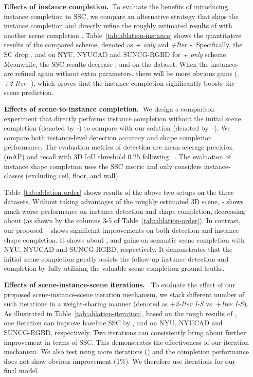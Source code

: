 \documentclass[final]{cvpr}
\begin{document}
\noindent \textbf{Effects of instance completion.~}To evaluate the benefits of introducing instance completion to SSC, we compare an alternative strategy that skips the instance completion and directly refine the roughly estimated results of  with another scene completion . Table~\ref{tab:ablation-instance} shows the quantitative results of the compared scheme, denoted as \textit{+  only} and \textit{+Iter -}. Specifically, the SC drop ,  and  on NYU, NYUCAD and SUNCG-RGBD for \textit{+ only} scheme. Meanwhile, the SSC results decrease ,  and  on the dataset. When the instances are refined again without extra parameters, there will be more obvious gains (\ie, \textit{+2-Iter -}), which proves that the instance completion significantly boosts the scene prediction. 




\noindent \textbf{Effects of scene-to-instance completion.~}We design a comparison experiment that directly performs instance completion without the initial scene completion (denoted by \textit{-}) to compare with our solution (denoted by \textit{--}). We compare both instance-level detection accuracy and shape completion performance. The evaluation metrics of detection are mean average precision (mAP) and recall with 3D IoU threshold 0.25 following ~\cite{song2015sun}. The evaluation of instance shape completion uses the SSC metric and only considers instance-classes (excluding ceil, floor, and wall).

Table~\ref{tab:ablation-order} shows results of the above two setups on the three datasets. 
Without taking advantages of the roughly estimated 3D scene, \textit{-} shows much worse performance on instance detection and shape completion, decreasing about  (as shown by the columns 3-5 of Table~\ref{tab:ablation-order}). In contrast, our proposed \textit{--} shows significant improvements on both detection and instance shape completion. It shows about ,  and  gains on semantic scene completion with NYU, NYUCAD and SUNCG-RGBD, respectively. It demonstrates that the initial scene completion greatly assists the follow-up instance detection and completion by fully utilizing the valuable scene completion ground truths.



\noindent \textbf{Effects of scene-instance-scene iterations.~}
To evaluate the effect of our proposed scene-instance-scene iteration mechanism, we stack different number of such iterations in a weight-sharing manner (denoted as +\textit{2-Iter I-S} vs. +\textit{Iter I-S}). As illustrated in Table~\ref{tab:ablation-iteration}, based on the rough results of , one iteration can improve baseline SSC by ,  and  on NYU, NYUCAD and SUNCG-RGBD, respectively. Two iterations can consistently bring about  further improvement in terms of SSC. This demonstrates the effectiveness of our iteration mechanism. We also test using more iterations () and the completion performance does not show obvious improvement (1\%). We therefore use  iterations for our final model.
\vspace{-0.3cm}
\end{document}
